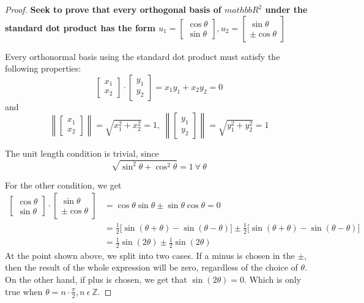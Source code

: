 \documentclass[10pt,letterpaper]{article}
\newcommand{\norm}[1]{\left\lVert#1\right\rVert}
\begin{document}
	\begin{proof}
		\textbf{Seek to prove that every orthogonal basis of $mathbb{R}^2$ under the standard dot product has the form $u_1 = \begin{bmatrix}
			\cos \theta \\ \sin \theta
			\end{bmatrix}, u_2 = \begin{bmatrix}
			\sin \theta \\ \pm \cos \theta
			\end{bmatrix}$}
		
		Every orthonormal basis using the standard dot product must satisfy the following properties: 
		$$
		\begin{bmatrix}
		x_1 \\ x_2
		\end{bmatrix} \cdot \begin{bmatrix}
		y_1 \\ y_2
		\end{bmatrix} = x_1y_1 + x_2y_2 = 0
		$$
		and 
		$$
		\norm{\begin{bmatrix}
			x_1 \\ x_2
			\end{bmatrix}} = \sqrt{x_1^2 + x_2^2} = 1, \: \norm{\begin{bmatrix}
			y_1 \\ y_2
			\end{bmatrix}} = \sqrt{y_1^2 + y_2^2} = 1
		$$
		
		The unit length condition is trivial, since 
		$$
		\sqrt{\sin^2\theta + \cos^2 \theta} = 1 \: \forall \: \theta
		$$
		
		For the other condition, we get 
		\begin{align*}
		\begin{bmatrix}
		\cos \theta \\ \sin \theta
		\end{bmatrix} \cdot \begin{bmatrix}
		\sin \theta \\ \pm \cos \theta
		\end{bmatrix} &= \cos \theta \sin \theta \pm \sin \theta \cos \theta = 0 \\
		& = \frac{1}{2} \big[ \sin (\theta + \theta) - \sin (\theta - \theta) \big] \pm \frac{1}{2} \big[ \sin (\theta + \theta) - \sin (\theta - \theta) \big] \\
		&= \frac{1}{2}\sin (2 \theta) \pm \frac{1}{2}\sin (2 \theta)
		\end{align*}
		At the point shown above, we split into two cases.  If a minus is chosen in the $\pm$, then the result of the whole expression will be zero, regardless of the choice of $\theta$. On the other hand, if plus is chosen, we get that $\sin (2 \theta) = 0$. Which is only true when $\theta = n \cdot \frac{\pi}{2}, n \: \epsilon \: \mathbb{Z}$.	
	\end{proof}
\end{document}
